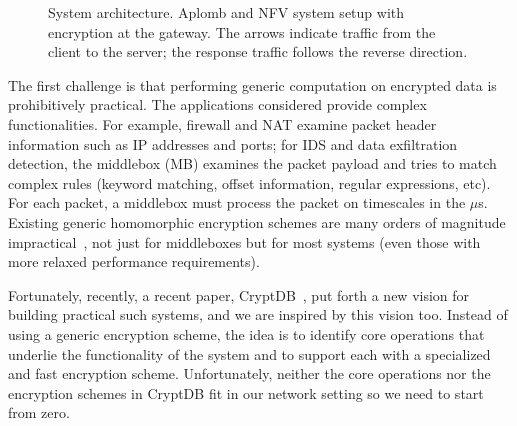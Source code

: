 \begin{figure}[t!]
\centering
{}
%
\hfill  
{}
     
\caption{System architecture. Aplomb and NFV system setup with \sys encryption  at the gateway. The arrows indicate traffic from the client to the server; the response traffic follows the reverse direction. \label{fig:sys-overview}}
\end{figure}


    
The first challenge is that performing generic computation on encrypted data is prohibitively practical. The applications considered provide complex functionalities. For example, firewall and NAT examine packet header information such as IP addresses and ports; for IDS and data exfiltration detection, the middlebox (MB) examines the packet payload and tries to match complex rules (keyword matching, offset information,  regular expressions, etc). For each packet, a middlebox must process the packet on timescales in the $\mu$s. Existing generic homomorphic encryption schemes are many orders of magnitude impractical~\cite{aesFHE}, not just for middleboxes but for most systems (even those with more relaxed performance requirements).

Fortunately, recently, a recent paper, CryptDB~\cite{popa:cryptdb}, put forth a new vision for building practical such systems, and we are inspired by this vision too. Instead of using a generic encryption scheme, the idea is to identify core operations that underlie the functionality of the system and to support each with a specialized and fast encryption scheme. Unfortunately, neither the core operations nor the encryption schemes in CryptDB fit in our network setting so we need to start from zero.

